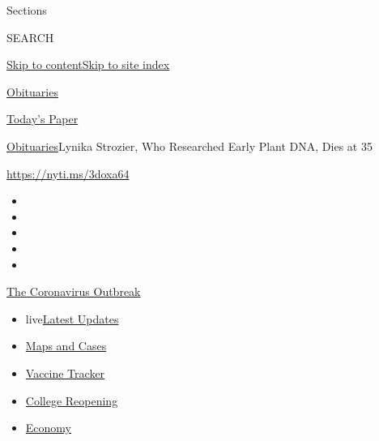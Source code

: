 Sections

SEARCH

\protect\hyperlink{site-content}{Skip to
content}\protect\hyperlink{site-index}{Skip to site index}

\href{https://www.nytimes3xbfgragh.onion/section/obituaries}{Obituaries}

\href{https://myaccount.nytimes3xbfgragh.onion/auth/login?response_type=cookie\&client_id=vi}{}

\href{https://www.nytimes3xbfgragh.onion/section/todayspaper}{Today's
Paper}

\href{/section/obituaries}{Obituaries}\textbar{}Lynika Strozier, Who
Researched Early Plant DNA, Dies at 35

\url{https://nyti.ms/3doxa64}

\begin{itemize}
\item
\item
\item
\item
\item
\end{itemize}

\href{https://www.nytimes3xbfgragh.onion/news-event/coronavirus?action=click\&pgtype=Article\&state=default\&region=TOP_BANNER\&context=storylines_menu}{The
Coronavirus Outbreak}

\begin{itemize}
\tightlist
\item
  live\href{https://www.nytimes3xbfgragh.onion/2020/08/04/world/coronavirus-covid-19.html?action=click\&pgtype=Article\&state=default\&region=TOP_BANNER\&context=storylines_menu}{Latest
  Updates}
\item
  \href{https://www.nytimes3xbfgragh.onion/interactive/2020/us/coronavirus-us-cases.html?action=click\&pgtype=Article\&state=default\&region=TOP_BANNER\&context=storylines_menu}{Maps
  and Cases}
\item
  \href{https://www.nytimes3xbfgragh.onion/interactive/2020/science/coronavirus-vaccine-tracker.html?action=click\&pgtype=Article\&state=default\&region=TOP_BANNER\&context=storylines_menu}{Vaccine
  Tracker}
\item
  \href{https://www.nytimes3xbfgragh.onion/2020/08/02/us/covid-college-reopening.html?action=click\&pgtype=Article\&state=default\&region=TOP_BANNER\&context=storylines_menu}{College
  Reopening}
\item
  \href{https://www.nytimes3xbfgragh.onion/live/2020/08/03/business/stock-market-today-coronavirus?action=click\&pgtype=Article\&state=default\&region=TOP_BANNER\&context=storylines_menu}{Economy}
\end{itemize}


